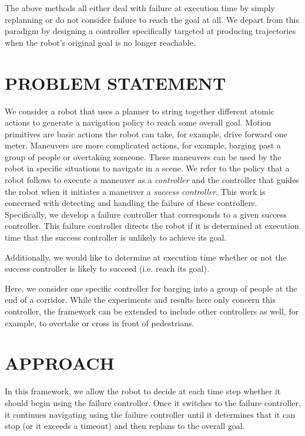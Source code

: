 \documentclass[letterpaper, 10 pt, conference]{ieeeconf}  %
\begin{document}
	The above methods all either deal with failure at execution time by simply replanning or do not consider failure to reach the goal at all. We depart from this paradigm by designing a controller specifically targeted at producing trajectories when the robot's original goal is no longer reachable.
	
\section{PROBLEM STATEMENT}\label{sec:problemstatement}
	We consider a robot that uses a planner to string together different atomic actions to generate a navigation policy to reach some overall goal. Motion primitives are basic actions the robot can take, for example, drive forward one meter. Maneuvers are more complicated actions, for example, barging past a group of people or overtaking someone. These maneuvers can be used by the robot in specific situations to navigate in a scene. We refer to the policy that a robot follows to execute a maneuver as a \textit{controller} and the controller that guides the robot when it initiates a maneuver a \textit{success controller}. This work is concerned with detecting and handling the failure of these controllers. Specifically, we develop a failure controller that corresponds to a given success controller. This failure controller directs the robot if it is determined at execution time that the success controller is unlikely to achieve its goal. 
	
	Additionally, we would like to determine at execution time whether or not the success controller is likely to succeed (i.e. reach its goal). 
	
	Here, we consider one specific controller for barging into a group of people at the end of a corridor. While the experiments and results here only concern this controller, the framework can be extended to include other controllers as well, for example, to overtake or cross in front of pedestrians.
		
\section{APPROACH}\label{sec:approach}
    In this framework, we allow the robot to decide at each time step whether it should begin using the failure controller. Once it switches to the failure controller, it continues navigating using the failure controller until it determines that it can stop (or it exceeds a timeout) and then replans to the overall goal. 
    
\end{document}
